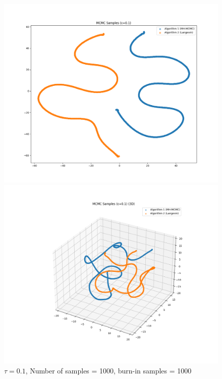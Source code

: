 \documentclass[a4paper,12pt]{article}
\begin{document}
\begin{figure}[H]
  \centering
  \begin{minipage}{0.48\textwidth}
    \includegraphics[width=\linewidth]{TASK-0-1/images/samples_eps0.1_n1000_burn500_tsne_2d.png}
  \end{minipage}
  \hfill
  \begin{minipage}{0.48\textwidth}
    \includegraphics[width=\linewidth]{TASK-0-1/images/samples_eps0.1_n1000_burn1000_tsne_3d.png}
  \end{minipage}
  \caption{$\tau = 0.1$, Number of samples = 1000, burn-in samples = 1000}
\end{figure}
\end{document}
